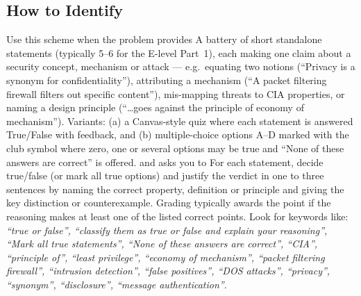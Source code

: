 \documentclass[12pt, a4paper]{article}
\begin{document}
\subsection*{How to Identify}
Use this scheme when the problem provides A battery of short standalone statements (typically 5--6 for the E-level Part~1), each making one claim about a security concept, mechanism or attack --- e.g.\ equating two notions (``Privacy is a synonym for confidentiality''), attributing a mechanism (``A packet filtering firewall filters out specific content''), mis-mapping threats to CIA properties, or naming a design principle (``\ldots goes against the principle of economy of mechanism''). Variants: (a) a Canvas-style quiz where each statement is answered True/False with feedback, and (b) multiple-choice options A--D marked with the club symbol where zero, one or several options may be true and ``None of these answers are correct'' is offered. and asks you to For each statement, decide true/false (or mark all true options) and justify the verdict in one to three sentences by naming the correct property, definition or principle and giving the key distinction or counterexample. Grading typically awards the point if the reasoning makes at least one of the listed correct points. Look for keywords like: \textit{``true or false'', ``classify them as true or false and explain your reasoning'', ``Mark all true statements'', ``None of these answers are correct'', ``CIA'', ``principle of'', ``least privilege'', ``economy of mechanism'', ``packet filtering firewall'', ``intrusion detection'', ``false positives'', ``DOS attacks'', ``privacy'', ``synonym'', ``disclosure'', ``message authentication''}.
\end{document}
